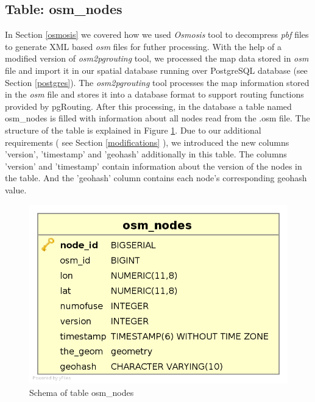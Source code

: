 \subsection{Table: osm{\_}nodes}
In Section \ref{osmosis} we covered how we used \textit{Osmosis} tool to decompress \textit{pbf} files to generate XML based \textit{osm} files for futher processing. With the help of a modified version of \textit{osm2pgrouting} tool, we processed the map data stored in \textit{osm} file and import it in our spatial database running over PostgreSQL database (see Section \ref{postgres}). The \textit{osm2pgrouting} tool processes the map information stored in the \textit{osm} file and stores it into a database format to support routing functions provided by pgRouting. After this processing, in the database a table named osm{\_}nodes is filled with information about all nodes read from the .osm file. The structure of the table is explained in Figure \ref{fg:osmnodes}. Due to our additional requirements ( see Section \ref{modifications} ), we introduced the new columns 'version', 'timestamp' and 'geohash' additionally in this table. The columns 'version' and 'timestamp' contain information about the version of the nodes in the table. And the 'geohash' column contains each node's corresponding geohash value. 
\begin{figure}
\includegraphics[scale=.3]{osmnodes.png}
\caption{Schema of table osm{\_}nodes}
\label{fg:osmnodes}
\end{figure}

